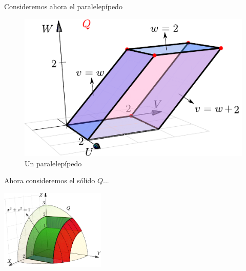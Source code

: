 \documentclass{article}
\begin{document}
	Consideremos ahora el paralelepípedo
	\begin{figure}[h!] %
		\centering %
		\includegraphics{images/figura3.pdf}
		\caption{Un paralelepípedo}\label{figura3}
	\end{figure}
	Ahora consideremos el sólido $Q$...
	\begin{center} %
		\includegraphics[width =5cm]{images/figura4.pdf}
		\label{figura3a}
	\end{center}
\end{document}
